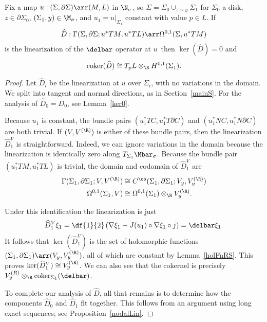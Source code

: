 \begin{lemma} \label{ob11open}
Fix a map $u:(\Sigma,\partial\Sigma) \arr (M,L)$ in $\N_\sigma$, so $\Sigma = \Sigma_0 \cup_{z \sim y} \Sigma_1$ for $\Sigma_0$ a disk, $z \in \partial\Sigma_0$, $(\Sigma_1,y) \in \M_\sigma$, and $u_1=u|_{\Sigma_1}$ constant with value $p \in L$. If
\[
\hat{D}:\Gamma(\Sigma,\partial\Sigma;u^*TM,u^*TL) \arr \Omega^{0,1}(\Sigma,u^*TM)
\]
is the linearization of the $\delbar$ operator at $u$\, then $\ker(\hat{D})=0$ and
\[
\coker(\hat{D}) \cong T_pL \otimes_\R H^{0,1}(\Sigma_1).
\]
\begin{proof}
Let $\hat{D}_i$ be the linearization at $u$ over $\Sigma_i$, with no variations in the domain. We split into tangent and normal directions, as in Section~\ref{mainS}. For the analysis of $\hat{D}_0=D_0$, see Lemma~\ref{ker0}.

Because $u_1$ is constant, the bundle pairs $(u_1^*TC,u_1^*T\partial C)$ and $(u_1^*NC,u_1^*N\partial C)$ are both trivial. If $(V,V^{(\R)})$ is either of these bundle pairs, then the linearization $\hat{D}_1^V$ is straightforward. Indeed, we can ignore variations in the domain because the linearization is identically zero along $T_{\Sigma_1}\Mbar_\sigma$. Because the bundle pair $(u_1^*TM,u_1^*TL)$ is trivial, the domain and codomain of $\hat{D}_1^V$ are
\begin{align*}
\Gamma(\Sigma_1, \partial\Sigma_1; V, V^{(\R)}) & \cong C^\oo(\Sigma_1,\partial\Sigma_1; V_y,V_y^{(\R)})
\\
\Omega^{0,1}(\Sigma_1,V) & \cong \Omega^{0,1}(\Sigma_1) \otimes_\R V_y^{(\R)}.
\end{align*}

Under this identification the linearization is just
\[
\hat{D}_1^V\xi_1 = \df{1}{2}\left( \nabla\xi_1+J(u_1) \circ \nabla\xi_1 \circ j \right) = \delbar\xi_1.
\]
It follows that $\ker(\hat{D}_1^V)$ is the set of holomorphic functions $(\Sigma_1,\partial\Sigma_1) \arr (V_y,V_y^{(\R)})$, all of which are constant by Lemma~\ref{holFnRS}. This proves $\ker(\hat{D}_1^V) \cong V_y^{(\R)}$. We can also see that the cokernel is precisely $V_y^{(R)} \otimes_\R \coker_{\Sigma_1}(\delbar)$.

To complete our analysis of $\hat{D}$, all that remains is to determine how the components $\hat{D}_0$ and $\hat{D}_1$ fit together. This follows from an argument using long exact sequences; see Proposition~\ref{nodalLin}.
\end{proof}
\end{lemma}

